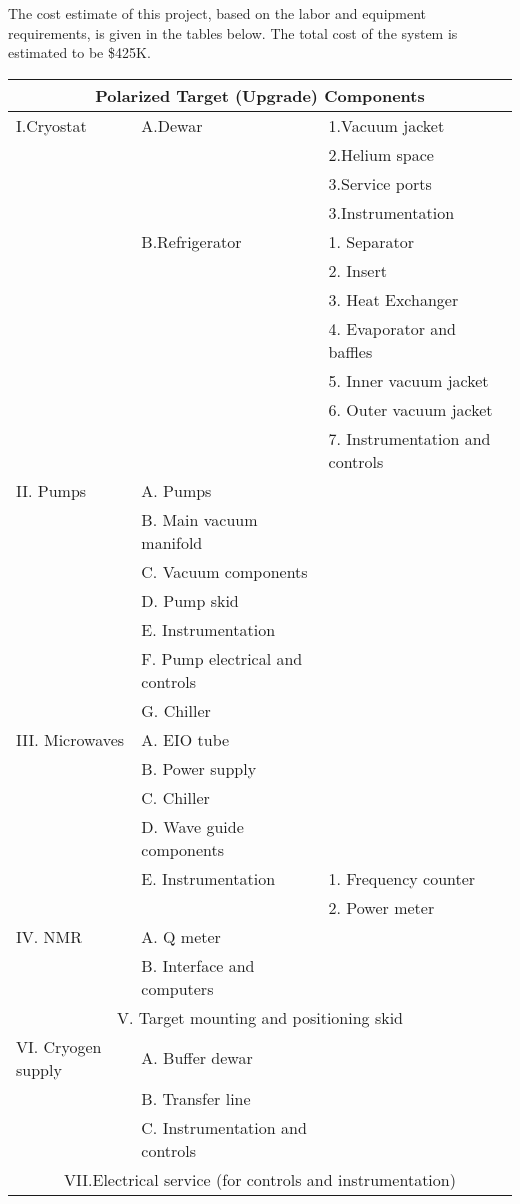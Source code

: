 The cost estimate of this project, based on the labor and equipment 
requirements, is given in the tables below.  The total cost of the 
system is estimated to be \$425K.

\begin{table}[h]
\begin{center}
\begin{tabular}{|l|l|l|}\hline
\multicolumn{3}{|c|}{\bfseries Polarized Target (Upgrade) Components}\\ \hline
I.Cryostat & A.Dewar  & 1.Vacuum jacket\\
           &          & 2.Helium space\\
           &          & 3.Service ports\\
           &          & 3.Instrumentation\\\hline  
           & B.Refrigerator & 1. Separator\\
	   &	            & 2. Insert\\
	   &		    & 3. Heat Exchanger\\
	   &		    & 4. Evaporator and baffles\\
	   &		    & 5. Inner vacuum jacket\\
	   &		    & 6. Outer vacuum jacket\\
	   &		    & 7. Instrumentation and controls\\ \hline
II. Pumps  & A. Pumps       &   \\
	     & B. Main vacuum manifold&\\
	     & C. Vacuum components&\\
	     & D. Pump skid&\\
	     & E. Instrumentation&\\
	     & F. Pump electrical and controls&\\
	     & G. Chiller&\\ \hline
III. Microwaves	 &A. EIO tube&\\
	           &B. Power supply&\\
	           &C. Chiller&\\
	           &D. Wave guide components&\\
	           &E. Instrumentation	&	1. Frequency counter\\
		   &                    &2. Power meter\\ \hline
IV. NMR		       & A. Q meter&\\
		           & B. Interface and computers&\\ \hline
\multicolumn{3}{|c|}{V.  Target mounting and positioning skid}\\ \hline
VI. Cryogen supply	&A. Buffer dewar&\\
	              &B. Transfer line&\\
	              &C. Instrumentation and controls&\\ \hline
\multicolumn{3}{|c|}{VII.Electrical service (for controls and instrumentation)}  \\ \hline         
\end{tabular}
\end{center}
\end{table}

